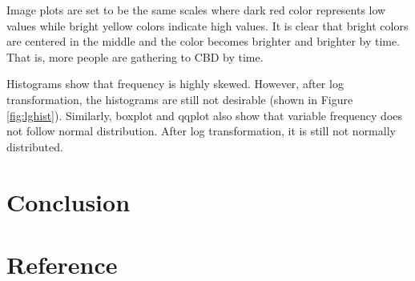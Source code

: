 \documentclass[hidelinks,12pt]{article}
\begin{document}
	Image plots are set to be the same scales where dark red color represents low values while bright yellow colors indicate high values. It is clear that bright colors are centered in the middle and the color becomes brighter and brighter by time. That is, more people are gathering to CBD by time.
	
	Histograms show that frequency is highly skewed. However, after log transformation, the histograms are still not desirable (shown in Figure \ref{fig:lghist}). Similarly, boxplot and qqplot also show that variable frequency does not follow normal distribution. After log transformation, it is still not normally distributed.


	\section{Conclusion}\label{sec:con}
	
	\section{Reference}\label{sec:ref}
	
	
	\newpage
	\appendix
\end{document}
